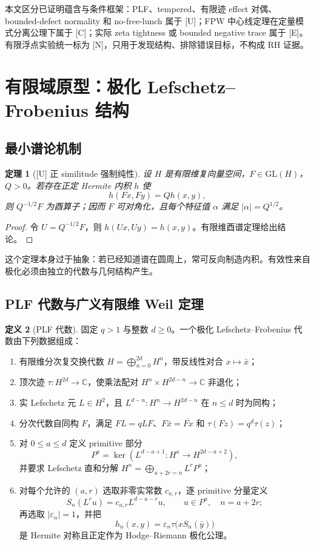 \documentclass[UTF8,11pt,a4paper]{ctexart}
\newtheorem{theorem}{定理}[section]
\theoremstyle{definition}
\newtheorem{definition}[theorem]{定义}
\theoremstyle{remark}
\newcommand{\C}{\mathbb C}
\newcommand{\1}{\mathbf 1}
\newcommand{\statusU}{\textnormal{[U]}}
\newcommand{\statusC}{\textnormal{[C]}}
\newcommand{\statusE}{\textnormal{[E]}}
\newcommand{\statusN}{\textnormal{[N]}}
\begin{document}
本文区分已证明蕴含与条件框架：PLF、tempered、有限迹 effect 对偶、bounded-defect normality 和 no-free-lunch 属于 \statusU{}；FPW 中心线定理在定量模式分离公理下属于 \statusC{}；实际 zeta tightness 或 bounded negative trace 属于 \statusE{}。有限浮点实验统一标为 \statusN{}，只用于发现结构、排除错误目标，不构成 RH 证据。

\section{有限域原型：极化 Lefschetz--Frobenius 结构}

\subsection{最小谱论机制}

\begin{theorem}[\statusU{} 正 similitude 强制纯性]
设 $H$ 是有限维复向量空间，$F\in\mathrm{GL}(H)$，$Q>0$。若存在正定 Hermite 内积 $h$ 使
\[
  h(Fx,Fy)=Qh(x,y),
\]
则 $Q^{-1/2}F$ 为酉算子；因而 $F$ 可对角化，且每个特征值 $\alpha$ 满足 $|\alpha|=Q^{1/2}$。
\end{theorem}

\begin{proof}
令 $U=Q^{-1/2}F$，则 $h(Ux,Uy)=h(x,y)$。有限维酉谱定理给出结论。
\end{proof}

这个定理本身过于抽象：若已经知道谱在圆周上，常可反向制造内积。有效性来自极化必须由独立的代数与几何结构产生。

\subsection{PLF 代数与广义有限维 Weil 定理}

\begin{definition}[PLF 代数]
固定 $q>1$ 与整数 $d\geq0$。一个极化 Lefschetz--Frobenius 代数由下列数据组成：
\begin{enumerate}
  \item 有限维分次复交换代数 $H=\bigoplus_{n=0}^{2d}H^n$，带反线性对合 $x\mapsto\bar x$；
  \item 顶次迹 $\tau:H^{2d}\to\C$，使乘法配对 $H^n\times H^{2d-n}\to\C$ 非退化；
  \item 实 Lefschetz 元 $L\in H^2$，且 $L^{d-n}:H^n\to H^{2d-n}$ 在 $n\leq d$ 时为同构；
  \item 分次代数自同构 $F$，满足 $FL=qLF$、$F\bar x=\overline{Fx}$ 和 $\tau(Fz)=q^d\tau(z)$；
  \item 对 $0\leq a\leq d$ 定义 primitive 部分
  \[
    P^a=\ker\!\left(L^{d-a+1}:H^a\longrightarrow H^{2d-a+2}\right),
  \]
  并要求 Lefschetz 直和分解 $H^n=\bigoplus_{a+2r=n}L^rP^a$；
  \item 对每个允许的 $(a,r)$ 选取非零实常数 $c_{a,r}$，逐 primitive 分量定义
  \[
    S_n(L^ru)=c_{a,r}L^{d-a-r}u,
    \qquad u\in P^a,\quad n=a+2r;
  \]
  再选取 $|\varepsilon_n|=1$，并把
  \[
    h_n(x,y)=\varepsilon_n\tau\bigl(xS_n(\bar y)\bigr)
  \]
  是 Hermite 对称且正定作为 Hodge--Riemann 极化公理。
\end{enumerate}
\end{definition}
\end{document}
